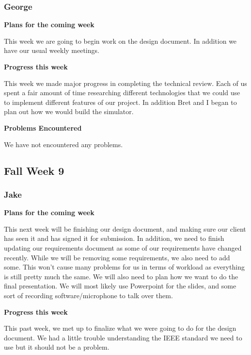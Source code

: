 \documentclass[10pt, onecolumn, draftclsnofoot, letterpaper, compsoc]{IEEEtran}
\begin{document}
    \subsubsection{George}

    \noindent \textbf{Plans for the coming week}

    This week we are going to begin work on the design document. In addition we
    have our usual weekly meetings.

    \noindent \textbf{Progress this week}

    This week we made major progress in completing the technical review. Each of
    us spent a fair amount of time researching different technologies that we could
    use to implement different features of our project. In addition Bret and I
    began to plan out how we would build the simulator.

    \noindent \textbf{Problems Encountered}

    We have not encountered any problems.

\subsection{Fall Week 9}

    \subsubsection{Jake}

    \noindent \textbf{Plans for the coming week}

    This next week will be finishing our design document, and making sure our
    client has seen it and has signed it for submission. In addition, we need to
    finish updating our requirements document as some of our requirements have
    changed recently. While we will be removing some requirements, we also need
    to add some. This won't cause many problems for us in terms of workload as
    everything is still pretty much the same. We will also need to plan how we
    want to do the final presentation. We will most likely use Powerpoint for the
    slides, and some sort of recording software/microphone to talk over them.

    \noindent \textbf{Progress this week}

    This past week, we met up to finalize what we were going to do for the design
    document. We had a little trouble understanding the IEEE standard we need to
    use but it should not be a problem.
\end{document}

